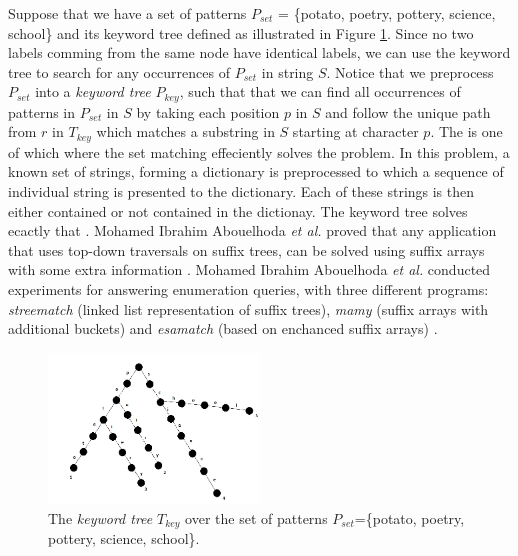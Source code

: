\documentclass[12pt]{article} %
\begin{document}
Suppose that we have a set of patterns $P_{set}$ = \{potato, poetry, pottery, science, school\} and its keyword tree defined as illustrated in Figure \ref{fig:KeywordTree}. Since no two labels comming from the same node have identical labels, we can use the keyword tree to search for any occurrences of $P_{set}$ in string $S$. Notice that we preprocess $P_{set}$ into a \emph{keyword tree} $P_{key}$, such that that we can find all occurrences of patterns in $P_{set}$ in $S$ by taking each position $p$ in $S$ and follow the unique path from $r$ in $T_{key}$ which matches a substring in $S$ starting at character $p$. The  is one of which where the set matching effeciently solves the problem. In this problem, a known set of strings, forming a dictionary is preprocessed to which a sequence of individual string is presented to the dictionary. Each of these strings is then either contained or not contained in the dictionay. The keyword tree solves ecactly that \cite{gusfield}. Mohamed Ibrahim Abouelhoda \emph{et al.} \cite{enchancedsuffix} proved that any application that uses top-down traversals on suffix trees, can be solved using suffix arrays with some extra information \cite{enchancedsuffix}. Mohamed Ibrahim Abouelhoda \emph{et al.} conducted experiments for answering enumeration queries, with three different programs: \emph{streematch} (linked list representation of suffix trees), \emph{mamy} (suffix arrays with additional buckets) and \emph{esamatch} (based on enchanced suffix arrays) \cite{enchancedsuffix}.
\begin{figure}[H]
    \centering
    \includegraphics[width=0.5\textwidth]{KeywordTree}
    \captionsetup{width=0.8
    \textwidth}
    \caption{The \emph{keyword tree} $T_{key}$ over the set of patterns $P_{set}$=\{potato, poetry, pottery, science, school\}.}
    \label{fig:KeywordTree}
\end{figure}
\end{document}
